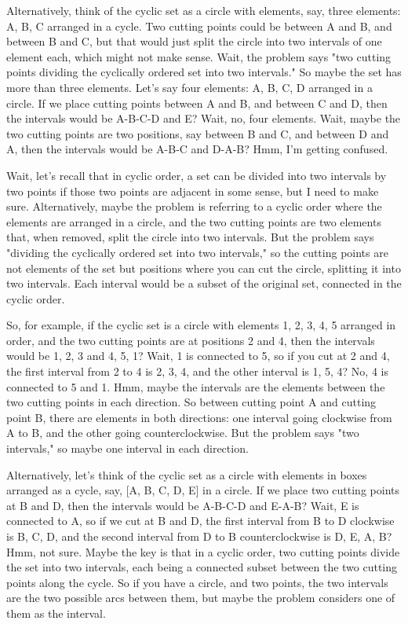 Alternatively, think of the cyclic set as a circle with elements, say, three elements: A, B, C arranged in a cycle. Two cutting points could be between A and B, and between B and C, but that would just split the circle into two intervals of one element each, which might not make sense. Wait, the problem says "two cutting points dividing the cyclically ordered set into two intervals." So maybe the set has more than three elements. Let's say four elements: A, B, C, D arranged in a circle. If we place cutting points between A and B, and between C and D, then the intervals would be A-B-C-D and E? Wait, no, four elements. Wait, maybe the two cutting points are two positions, say between B and C, and between D and A, then the intervals would be A-B-C and D-A-B? Hmm, I'm getting confused.

Wait, let's recall that in cyclic order, a set can be divided into two intervals by two points if those two points are adjacent in some sense, but I need to make sure. Alternatively, maybe the problem is referring to a cyclic order where the elements are arranged in a circle, and the two cutting points are two elements that, when removed, split the circle into two intervals. But the problem says "dividing the cyclically ordered set into two intervals," so the cutting points are not elements of the set but positions where you can cut the circle, splitting it into two intervals. Each interval would be a subset of the original set, connected in the cyclic order.

So, for example, if the cyclic set is a circle with elements 1, 2, 3, 4, 5 arranged in order, and the two cutting points are at positions 2 and 4, then the intervals would be {1, 2, 3} and {4, 5, 1}? Wait, 1 is connected to 5, so if you cut at 2 and 4, the first interval from 2 to 4 is 2, 3, 4, and the other interval is 1, 5, 4? No, 4 is connected to 5 and 1. Hmm, maybe the intervals are the elements between the two cutting points in each direction. So between cutting point A and cutting point B, there are elements in both directions: one interval going clockwise from A to B, and the other going counterclockwise. But the problem says "two intervals," so maybe one interval in each direction.

Alternatively, let's think of the cyclic set as a circle with elements in boxes arranged as a cycle, say, [A, B, C, D, E] in a circle. If we place two cutting points at B and D, then the intervals would be A-B-C-D and E-A-B? Wait, E is connected to A, so if we cut at B and D, the first interval from B to D clockwise is B, C, D, and the second interval from D to B counterclockwise is D, E, A, B? Hmm, not sure. Maybe the key is that in a cyclic order, two cutting points divide the set into two intervals, each being a connected subset between the two cutting points along the cycle. So if you have a circle, and two points, the two intervals are the two possible arcs between them, but maybe the problem considers one of them as the interval.

